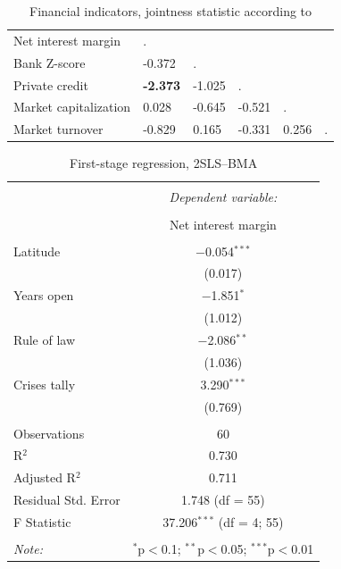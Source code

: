 \begin{refsection}
\begin{subappendices}
\begin{table}[!htbp]
\caption{Financial indicators, jointness statistic according to \textcite{doppelhoferweeks2009}}
\label{ch2tab:joint3}
\small
\centering
\begin{tabular}{llllll}
   \toprule
  Net interest margin & . &  &  & & \\ 
  Bank Z-score & -0.372 & . &  &  & \\ 
  Private credit & \textbf{-2.373} & -1.025 & . &  & \\ 
  Market capitalization & 0.028 & -0.645 & -0.521 & . & \\ 
  Market turnover & -0.829 & 0.165 & -0.331 & 0.256 & . \\ 
   \bottomrule
\end{tabular}
\end{table}  
%

\begin{table}[!ht] \centering 
	\caption{First-stage regression, 2SLS--BMA}
	\label{app1tab:1ststageIV} 
  \begin{tabular}{@{\extracolsep{5pt}}lc}
  \\[-1.8ex]\hline
  \hline \\[-1.8ex] 
   & \multicolumn{1}{c}{\textit{Dependent variable:}} \\ 
  \cline{2-2}
  \\[-1.8ex] & Net interest margin \\
  \hline \\[-1.8ex]
   Latitude & $-$0.054$^{***}$ \\
	& (0.017) \\ 
   Years open & $-$1.851$^{*}$ \\
	& (1.012) \\ 
   Rule of law & $-$2.086$^{**}$ \\
	& (1.036) \\
   Crises tally & 3.290$^{***}$ \\ 
	& (0.769) \\ 
  \hline \\[-1.8ex]
  Observations & 60 \\
  R$^{2}$ & 0.730 \\
  Adjusted R$^{2}$ & 0.711 \\ 
  Residual Std. Error & 1.748 (df = 55) \\ 
  F Statistic & 37.206$^{***}$ (df = 4; 55) \\ 
  \hline
  \hline \\[-1.8ex]
  \textit{Note:}  & \multicolumn{1}{r}{$^{*}$p$<$0.1; $^{**}$p$<$0.05; $^{***}$p$<$0.01} \\
  \end{tabular}
  \end{table}

\end{subappendices}
\end{refsection}